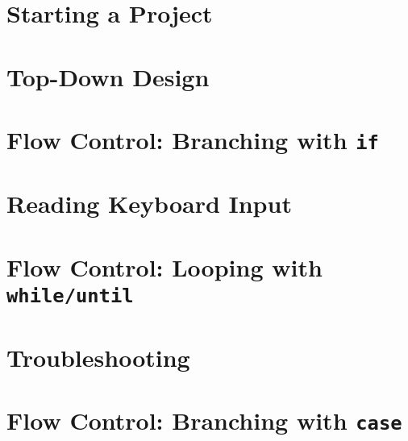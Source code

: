 \documentclass[oneside]{book}
\numberwithin{equation}{section}
\begin{document}

\section{Starting a Project}


\section{Top-Down Design}


\section{Flow Control: Branching with \texttt{if}}


\section{Reading Keyboard Input}


\section{Flow Control: Looping with \texttt{while/until}}


\section{Troubleshooting}


\section{Flow Control: Branching with \texttt{case}}

\end{document}
